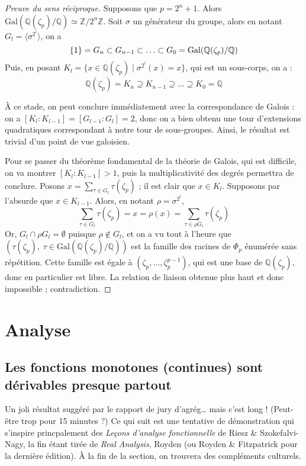 \documentclass[a4paper, 11pt]{article}
\def\Z{\mathbb{Z}}
\def\Q{\mathbb{Q}}
\begin{document}
\begin{proof}[Preuve du sens réciproque]
  Supposons que $p = 2^n + 1$. Alors $\mathrm{Gal}(\Q(\zeta_p)/\Q) \simeq
  \Z/2^n\Z$. Soit $\sigma$ un générateur du groupe, alors en notant $G_l =
  \langle \sigma^{2^l} \rangle$, on a
  \[ \{1\} = G_n \subset G_{n-1} \subset \ldots \subset G_0 =
    \textnormal{Gal}(\Q(\zeta_p)/\Q) \]
  Puis, en posant $K_l = \{x \in \Q(\zeta_p) \mid \sigma^{2^l}(x) = x\}$,
  qui est un sous-corps, on a :
  \[ \Q(\zeta_p) = K_n \supseteq K_{n-1} \supseteq \ldots \supseteq K_0 = \Q \]

  À ce stade, on peut conclure immédiatement avec la correspondance de Galois :
  on a $[K_l : K_{l-1}] = [G_{l-1} : G_l] = 2$, donc on a bien obtenu une tour
  d'extensions quadratiques correspondant à notre tour de sous-groupes. Ainsi,
  le résultat est trivial d'un point de vue galoisien.

  Pour se passer du théorème fondamental de la théorie de Galois, qui est
  difficile, on va montrer $[K_l : K_{l-1}] > 1$, puis la multiplicativité des
  degrés permettra de conclure. Posons $x = \sum_{\tau \in G_l} \tau(\zeta_p)$ ;
  il est clair que $x \in K_l$. Supposons par l'absurde que $x \in K_{l-1}$.
  Alors, en notant $\rho = \sigma^{2^l}$,
  \[ \sum_{\tau \in G_l} \tau(\zeta_p) = x = \rho(x) = \sum_{\tau \in \rho G_l}
    \tau(\zeta_p) \]
  Or, $G_l \cap \rho G_l = \emptyset$ puisque $\rho \notin G_l$, et on a vu tout
  à l'heure que $(\tau(\zeta_p),\;\tau \in \mathrm{Gal}(\Q(\zeta_p)/\Q))$ est la
  famille des racines de $\Phi_p$ énumérée sans répétition. Cette famille est
  égale à $(\zeta_p, \ldots, \zeta_p^{p-1})$, qui est une base de $\Q(\zeta_p)$,
  donc en particulier est libre. La relation de liaison obtenue plus haut et
  donc impossible ; contradiction.
\end{proof}


\newpage

\section{Analyse}

\subsection{Les fonctions monotones (continues) sont dérivables presque partout}

Un joli résultat suggéré par le rapport de jury d'agrég… mais c'est long !
(Peut-être trop pour 15 minutes ?) Ce qui suit est une tentative de
démonstration qui s'inspire princpalement des \emph{Leçons d'analyse
  fonctionnelle} de Riesz \& Szokefalvi-Nagy, la fin étant tirée de \emph{Real
  Analysis}, Royden (ou Royden \& Fitzpatrick pour la dernière édition). À la
fin de la section, on trouvera des compléments culturels.
\end{document}
